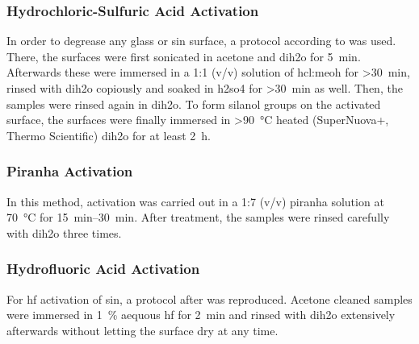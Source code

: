 \subsubsection{Hydrochloric-Sulfuric Acid Activation}
In order to degrease any glass or \gls{sin} surface, a protocol according to \citet{lit:chem:Dressick} was used. There, the surfaces were first sonicated in acetone and \gls{dih2o}  for \SI{5}{\minute}. Afterwards these were immersed in a 1:1 (v/v) solution of \gls{hcl}:\gls{meoh} for \SI{>30}{\minute}, rinsed with \gls{dih2o} copiously and soaked in \gls{h2so4} for \SI{>30}{\minute} as well. Then, the samples were rinsed again in \acrlong{dih2o}. To form silanol groups on the activated surface, the surfaces were finally immersed in \SI{>90}{\degreeCelsius} heated (SuperNuova+, Thermo Scientific) \gls{dih2o}  for at least \SI{2}{\hour}.
\subsubsection{Piranha Activation}
In this method, activation was carried out in a 1:7 (v/v) piranha solution at \SI{70}{\degreeCelsius} for \SIrange{15}{30}{\minute}. After treatment, the samples were rinsed carefully with \gls{dih2o} three times.
\subsubsection{Hydrofluoric Acid Activation}
For \gls{hf} activation of \gls{sin}, a protocol after \citet{lit:chem:sin:surfacEtchingandMod} was reproduced. Acetone cleaned samples were immersed in \SI{1}{\percent} aequous \gls{hf} for \SI{2}{\minute} and rinsed with \gls{dih2o} extensively afterwards without letting the surface dry at any time.

